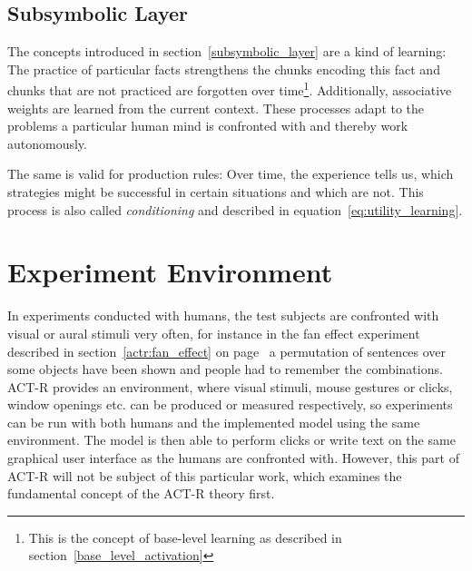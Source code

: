 \subsection{Subsymbolic Layer}

The concepts introduced in section~\ref{subsymbolic_layer} are a kind of learning: The practice of particular facts strengthens the chunks encoding this fact and chunks that are not practiced are forgotten over time\footnote{This is the concept of base-level learning as described in section~\ref{base_level_activation}}. Additionally, associative weights are learned from the current context. These processes adapt to the problems a particular human mind is confronted with and thereby work autonomously.

The same is valid for production rules: Over time, the experience tells us, which strategies might be successful in certain situations and which are not. This process is also called \emph{conditioning} and described in equation~\eqref{eq:utility_learning}.

\section{Experiment Environment}
\label{experiment_environment}

In experiments conducted with humans, the test subjects are confronted with visual or aural stimuli very often, for instance in the fan effect experiment described in section~\ref{actr:fan_effect} on page~\pageref{actr:fan_effect} a permutation of sentences over some objects have been shown and people had to remember the combinations. ACT-R provides an environment, where visual stimuli, mouse gestures or clicks, window openings etc. can be produced or measured respectively, so experiments can be run with both humans and the implemented model using the same environment. The model is then able to perform clicks or write text on the same graphical user interface as the humans are confronted with. However, this part of ACT-R will not be subject of this particular work, which examines the fundamental concept of the ACT-R theory first.
